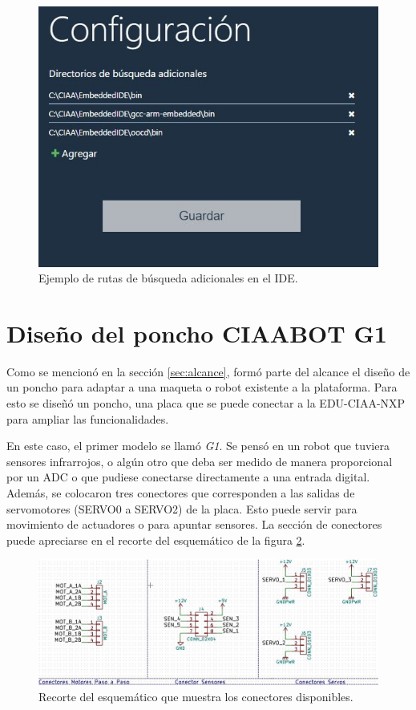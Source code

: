 \begin{figure}[H]
\centering
\includegraphics[scale=.8]{./Figures/path.jpg}
\caption{Ejemplo de rutas de búsqueda adicionales en el IDE.}
\label{fig:idePath}
\end{figure}


\section{Diseño del poncho CIAABOT G1}
Como se mencionó en la sección \ref{sec:alcance}, formó parte del alcance el diseño de un poncho para adaptar a una maqueta o robot existente a la plataforma. Para esto se diseñó un poncho, una placa que se puede conectar a la EDU-CIAA-NXP para ampliar las funcionalidades.

En este caso, el primer modelo se llamó \emph{G1}. Se pensó en un robot que tuviera sensores infrarrojos, o algún otro que deba ser medido de manera proporcional por un ADC o que pudiese conectarse directamente a una entrada digital. Además, se colocaron tres conectores que corresponden a las salidas de servomotores (SERVO0 a SERVO2) de la placa. Esto puede servir para movimiento de actuadores o para apuntar sensores. La sección de conectores puede apreciarse en el recorte del esquemático de la figura \ref{fig:g1Conectores}.

\begin{figure}[H]
\centering
\includegraphics[scale=.4]{./Figures/g1-conectores.JPG}
\caption{Recorte del esquemático que muestra los conectores disponibles.}
\label{fig:g1Conectores}
\end{figure}


